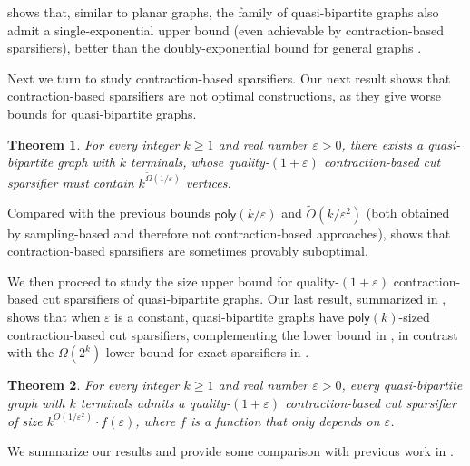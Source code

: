 \documentclass[11pt]{article}
\newtheorem{theorem}{Theorem}
\theoremstyle{definition}
\newcommand{\eps}{{\varepsilon}}
\newcommand{\poly}{\mathsf{poly}}
\begin{document}
 shows that, similar to planar graphs, the family of quasi-bipartite graphs also admit a single-exponential upper bound (even achievable by contraction-based sparsifiers), better than the doubly-exponential bound for general graphs \cite{hagerup1998characterizing,khan2014mimicking,karpov2017exponential}.

Next we turn to study contraction-based sparsifiers.
Our next result shows that contraction-based sparsifiers are not optimal constructions, as they give worse bounds for quasi-bipartite graphs.

\begin{theorem}
\label{main: lower}
For every integer $k\ge 1$ and real number $\eps>0$, there exists a quasi-bipartite graph with $k$ terminals, whose quality-$(1+\eps)$ contraction-based cut sparsifier must contain $k^{\tilde\Omega(1/\eps)}$ vertices.
\end{theorem}

Compared with the previous bounds $\poly(k/\eps)$ \cite{andoni2014towards} and $\tilde O(k/\eps^2)$ \cite{jambulapati2023sparsifying} (both obtained by sampling-based and therefore not contraction-based approaches),  shows that contraction-based sparsifiers are sometimes provably suboptimal.

We then proceed to study the size upper bound for quality-$(1+\eps)$ contraction-based cut sparsifiers of quasi-bipartite graphs. Our last result, summarized in , shows that when $\eps$ is a constant, quasi-bipartite graphs have $\poly(k)$-sized contraction-based cut sparsifiers, complementing the lower bound in , in contrast with the $\Omega(2^k)$ lower bound for exact sparsifiers in .

\begin{theorem}
\label{quasi_apx}
For every integer $k\ge 1$ and real number $\eps>0$, every quasi-bipartite graph with $k$ terminals admits a quality-$(1+\eps)$ contraction-based cut sparsifier of size $k^{O(1/\eps^2)}\cdot f(\eps)$, where $f$ is a function that only depends on $\eps$.
\end{theorem}

We summarize our results and provide some comparison with previous work in .
\end{document}
